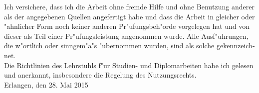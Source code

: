 \documentclass[english,bt]{package/lmedoc}
\begin{document}
{\begin{titlepage}
\begin{center}
    \vspace{3.5cm}

    \begin{minipage}{0.25\textwidth}
    \end{minipage}
    \qquad
    \begin{minipage}{0.6\textwidth}
    \vspace{7mm}
    \end{minipage}

    \end{center}

    \restoregeometry
    \end{titlepage}

    \setmainfont[   Path = fonts/,
                    BoldFont = BookmanOldStyleBold.ttf,
                    BoldItalicFont = BookmanOldStyleBoldItalic.ttf,
                    ItalicFont = BookmanOldStyleItalic.ttf]{BookmanOldStyle.ttf}
}{
  \begin{deckblatt}
  \end{deckblatt}
}

\cleardoublepage

\begin{otherlanguage}{ngerman}
Ich versichere, dass ich die Arbeit ohne fremde Hilfe und ohne Benutzung
anderer als der angegebenen Quellen angefertigt habe und dass die Arbeit
in glei\-cher oder "ahnlicher Form noch keiner anderen Pr"ufungsbeh"orde
vorgelegen hat und von dieser als Teil einer Pr"ufungsleistung
angenommen wurde. Alle Ausf"uhrungen, die w"ortlich oder sinngem"a"s
"ubernommen wurden, sind als solche gekennzeichnet.
\\

Die Richtlinien des Lehrstuhls f"ur Studien- und Diplomarbeiten
habe ich gelesen und anerkannt, insbesondere die Regelung des
Nutzungsrechts. \\[15mm]

Erlangen, den 28. Mai 2015 \hspace{6.0cm} \\[10mm]
\end{otherlanguage}
\end{document}
